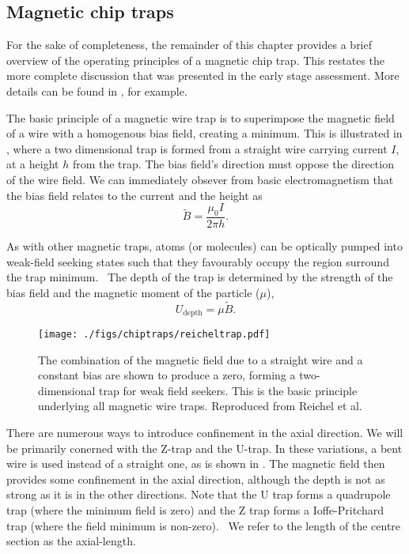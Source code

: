 \subsection*{Magnetic chip traps}

For the sake of completeness, the remainder of this chapter provides a brief
overview of the operating principles of a magnetic chip trap. This restates the
more complete discussion that was presented in the early stage assessment. More
details can be found in , for example.

The basic principle of a magnetic wire trap is to superimpose the magnetic
field of a wire with a homogenous bias field, creating a minimum. This is
illustrated in , where a two dimensional
trap is formed from a straight wire carrying current $I$, at a height $h$ from
the trap. 
The bias field's direction must oppose the
direction of the wire field. We can immediately obsever from basic
electromagnetism that the bias field relates to the current and the height as
%
\begin{equation}
  \tilde{B} = \frac{\mu_0 I}{2\pi h}.
  \label{into:eq:trapbias}
\end{equation}


As with other magnetic traps, atoms (or molecules) can be optically pumped into
weak-field seeking states such that they favourably occupy the region surround
the trap minimum.~\cite{Metcalf1999} The depth of the trap is determined by the
strength of the bias field and the magnetic moment of the particle ($\mu$),
%
\begin{equation}
  U_\text{depth} = \mu \tilde{B}. 
  \label{intro:eq:trapdepth}
\end{equation}

\begin{figure}
  \centering
  \texttt{[image: ./figs/chiptraps/reicheltrap.pdf]}
  \caption{The combination of the magnetic field due to a straight wire and a
  constant bias are shown to produce a zero, forming a two-dimensional trap for
  weak field seekers. This is the basic principle underlying all magnetic wire
  traps. Reproduced from Reichel et al.~\cite{Reichel1999}
  }
  \label{intro:fig:reicheltrap}
\end{figure}

There are numerous ways to introduce confinement in the axial direction. We
will be primarily conerned with the Z-trap and the U-trap. In these variations,
a bent wire is used instead of a straight one, as is shown in
. The magnetic field then provides some confinement in the
axial direction, although the depth is not as strong as it is in the other
directions. Note that the U trap forms a quadrupole trap (where the minimum
field is zero) and the Z trap forms a Ioffe-Pritchard trap (where the field
minimum is non-zero).~\cite{} We refer to the length of the centre section as
the axial-length.

